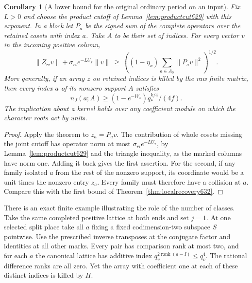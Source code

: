 \documentclass[a4paper,11pt]{article}
\newtheorem{corollary}[proposition]{Corollary}
\theoremstyle{definition}
\theoremstyle{remark}
\numberwithin{equation}{section}
\begin{document}
\begin{corollary}[A lower bound for the original ordinary period on an input]
\leavevmode\label{cor:fullinput632}
Fix \(L>0\) and choose the product cutoff of
Lemma~\ref{lem:productcut629} with this exponent. In a block let
\(P_a\) be the signed sum of the complete operators over the retained
cosets with index \(a\). Take \(A\) to be their set of indices.
For every vector \(v\) in the incoming positive column,
\[
 \|Z_{ri}v\|+\sigma_{ri}e^{-LU_x}\|v\|
       \ \ge\ \left((1-\eta_x)
                           \sum_{a\in A_0}\|P_a v\|^2\right)^{1/2}.
\]
More generally, if an array \(z\) on retained indices is killed
by the raw finite matrix, then every index \(a\) of its nonzero
support \(A\) satisfies
\[
              n_J(a;A)\ge (1-e^{-W_x})q_*^{k/4}/(4f).
\]
The implication about a kernel holds over any coefficient module
on which the character roots act by units.
\end{corollary}
\begin{proof}
Apply the theorem to \(z_a=P_a v\). The contribution of whole
cosets missing the joint cutoff has operator norm at most
\(\sigma_{ri}e^{-LU_x}\), by Lemma~\ref{lem:productcut629} and
the triangle inequality, as the marked columns have norm one.
Adding it back gives the first assertion. For the second, if any
family isolated \(a\) from the rest of the nonzero support, its
coordinate would be a unit times the nonzero entry \(z_a\).
Every family must therefore have a collision at \(a\). Compare
this with the first bound of Theorem~\ref{thm:localrecovery632}.
\end{proof}

There is an exact finite example illustrating the role of the number
of classes. Take the same completed positive lattice at both ends
and set \(j=1\). At one selected split place take all \(a\) fixing a
fixed codimension-two subspace \(S\) pointwise. Use the prescribed
inverse transposes at the conjugate factor and identities at all
other marks. Every pair has comparison rank at most two, and for
each \(a\) the canonical lattice has additive index
\(q_v^{2\operatorname{rank}(a-I)}\le q_v^4\). The rational
difference ranks are all zero. Yet the array with coefficient one
at each of these distinct indices is killed by \(H\).
\end{document}
